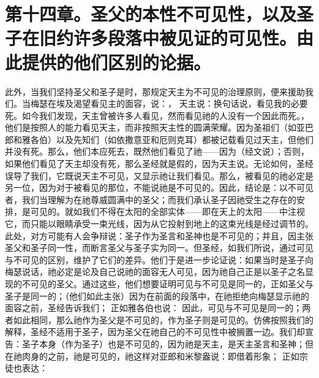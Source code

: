 \section{第十四章。圣父的本性不可见性，以及圣子在旧约许多段落中被见证的可见性。由此提供的他们区别的论据。}

此外，当我们坚持圣父和圣子是时，那规定天主为不可见的治理原则，便来援助我们。当梅瑟在埃及渴望看见主的面容，说：， 天主说：换句话说，看见我的必要死。如今我们发现，天主曾被许多人看见，然而看见祂的人没有一个因此而死。，他们是按照人的能力看见天主，而非按照天主性的圆满荣耀。因为圣祖们（如亚巴郎和雅各伯）以及先知们（如依撒意亚和厄则克耳）都被记载看见过天主，但他们并没有死。那么，他们本应死去，既然他们看见了祂——因为（经文说）；否则，如果他们看见了天主却没有死，那么圣经就是假的，因为天主说。无论如何，圣经误导了我们，它既说天主不可见，又显示祂让我们看见。那么，被看见的祂必定是另一位，因为对于被看见的那位，不能说祂是不可见的。因此，结论是：以不可见者，我们当理解为在祂尊威圆满中的圣父；而我们承认圣子因祂受生之存在的安排，是可见的。就如我们不得在太阳的全部实体——即在天上的太阳——中注视它，而只能以眼睛承受一束光线，因为从它投射到地上的这束光线是经过调节的。此处，对方可能有人会争辩说：圣子作为圣言和圣神也是不可见的；并且，因主张圣父和圣子同一性，而断言圣父与圣子实为同一。但圣经，如我们所说，通过可见与不可见的区别，维护了它们的差异。他们于是进一步论证说：如果当时是圣子向梅瑟说话，祂必定是论及自己说祂的面容无人可见，因为祂自己正是以圣子之名显现的不可见的圣父。通过这些，他们想要证明可见与不可见是同一的，正如圣父与圣子是同一的；（他们如此主张）因为在前面的段落中，在祂拒绝向梅瑟显示祂的面容之前，圣经告诉我们； 正如雅各伯也说： 因此，可见与不可见是同一的；两者如此相同，那么祂作为圣父是不可见的，作为圣子则是可见的。仿佛按照我们的解释，圣经不适用于圣子，因为圣父在祂自己的不可见性中被搁置一边。我们却宣告：圣子本身（作为圣子）也是不可见的，因为祂是天主，是天主圣言和圣神；但在祂肉身的之前，祂是可见的，祂这样对亚郎和米黎盎说：即借着形象； 正如宗徒也表达： 